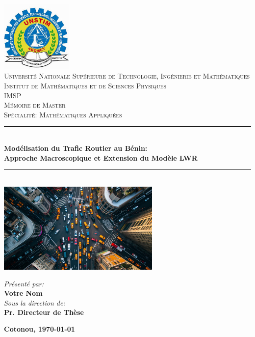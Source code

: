 \begin{titlepage}
\thispagestyle{empty}
\pagecolor{white} %

\begin{center}

\vspace*{-1cm}
\includegraphics[width=3.5cm]{images/logo-university.jpg}\\[0.5cm]

\textsc{\Large Université Nationale Supérieure de Technologie, Ingénierie et Mathématiques}\\[0.3cm]
\textsc{\large Institut de Mathématiques et de Sciences Physiques}\\[0.2cm]
\textsc{\large IMSP}\\[1.5cm]

\textsc{\large Mémoire de Master}\\
\textsc{\normalsize Spécialité: Mathématiques Appliquées}\\[2cm]

{\color{darkblue}\rule{\textwidth}{1.5pt}}\\[0.45cm]
{\LARGE\bfseries\color{darkblue}Modélisation du Trafic Routier au Bénin:\\[0.2cm]
\large Approche Macroscopique et Extension du Modèle LWR}\\[0.45cm]
{\color{darkblue}\rule{\textwidth}{1.5pt}}\\[1.5cm]

\includegraphics[width=8cm]{images/traffic-graphic.jpg}\\[1.2cm]

\begin{flushright}
\large
\emph{Présenté par:}\\
\textbf{Votre Nom}\\[1cm]
\emph{Sous la direction de:}\\
\textbf{Pr. Directeur de Thèse}\\
\end{flushright}

\vfill

{\large\bfseries Cotonou, \today}

\end{center}
\end{titlepage}
\pagecolor{pagebackground} %
